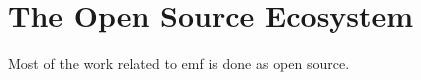 \section{The Open Source Ecosystem}

Most of the work related to \acrlong{emf} is done as \gls{open source}.


